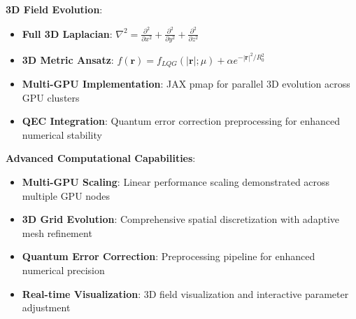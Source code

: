 \textbf{3D Field Evolution}:
\begin{itemize}
\item \textbf{Full 3D Laplacian}: $\nabla^2 = \frac{\partial^2}{\partial x^2} + \frac{\partial^2}{\partial y^2} + \frac{\partial^2}{\partial z^2}$
\item \textbf{3D Metric Ansatz}: $f(\mathbf{r}) = f_{LQG}(|\mathbf{r}|;\mu) + \alpha e^{-|\mathbf{r}|^2/R_0^2}$
\item \textbf{Multi-GPU Implementation}: JAX pmap for parallel 3D evolution across GPU clusters
\item \textbf{QEC Integration}: Quantum error correction preprocessing for enhanced numerical stability
\end{itemize}

\textbf{Advanced Computational Capabilities}:
\begin{itemize}
\item \textbf{Multi-GPU Scaling}: Linear performance scaling demonstrated across multiple GPU nodes
\item \textbf{3D Grid Evolution}: Comprehensive spatial discretization with adaptive mesh refinement
\item \textbf{Quantum Error Correction}: Preprocessing pipeline for enhanced numerical precision
\item \textbf{Real-time Visualization}: 3D field visualization and interactive parameter adjustment
\end{itemize}

